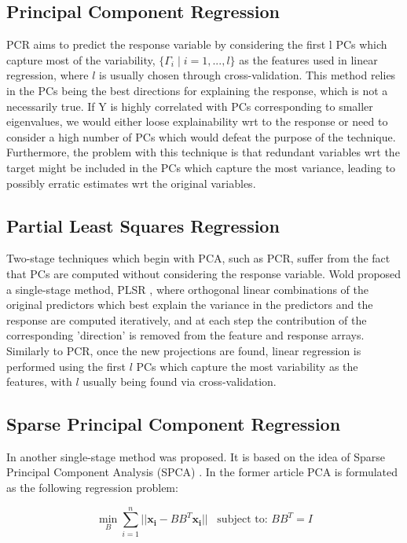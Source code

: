 \documentclass{article}
\begin{document}
\subsection{Principal Component Regression}
PCR aims to predict the response variable by considering the first l PCs which capture most of the variability, $\{\Gamma_{i}\;|\;i = 1,...,l\}$ as the features used in linear regression, where $l$ is usually chosen through cross-validation. This method relies in the PCs being the best directions for explaining the response, which is not a necessarily true. If Y is highly correlated with PCs corresponding to smaller eigenvalues, we would either loose explainability wrt to the response or need to consider a high number of PCs which would defeat the purpose of the technique. Furthermore, the problem with this technique is that redundant variables wrt the target might be included in the PCs which capture the most variance, leading to possibly erratic estimates wrt the original variables.

\subsection{Partial Least Squares Regression}
Two-stage techniques which begin with PCA, such as PCR, suffer from the fact that PCs are computed without considering the response variable. Wold proposed a single-stage method, PLSR \cite{Wold1966}, where orthogonal linear combinations of the original predictors which best explain the variance in the predictors and the response are computed iteratively, and at each step the contribution of the corresponding 'direction' is removed from the feature and response arrays. Similarly to PCR, once the new projections are found, linear regression is performed using the first $l$ PCs which capture the most variability as the features, with $l$ usually being found via cross-validation.

\subsection{Sparse Principal Component Regression}
In \cite{SPCR2018} another single-stage method was proposed. It is based on the idea of Sparse Principal Component Analysis (SPCA) \cite{SPCA}. In the former article PCA is formulated as the following regression problem: 

\vspace{-2.5em}

\begin{center}
    $$\displaystyle\min_{B}\sum_{i=1}^{n}||\boldsymbol{x_{i}}-BB^{T}\boldsymbol{x_{i}}||\;\;\;\text{subject to: $BB^{T} = I$}$$
\end{center}
\end{document}

